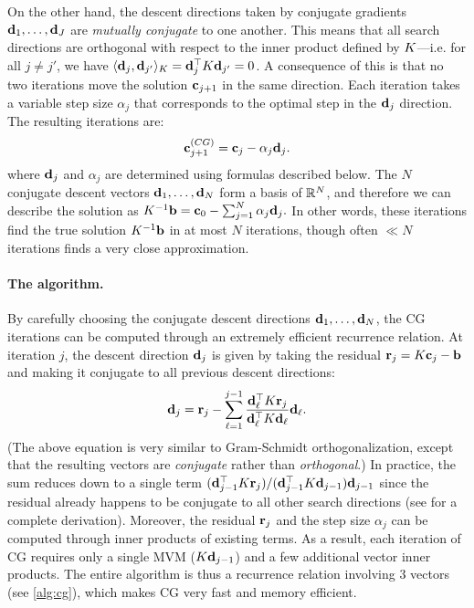 On the other hand, the descent directions taken by conjugate gradients $\mathbf{d}_1, \ldots, \mathbf{d}_J$ are \emph{mutually conjugate} to one another.
This means that all search directions are orthogonal with respect to the inner product defined by $K$---i.e. for all $j \ne j'$, we have $\langle \mathbf{d}_j, \mathbf{d}_{j'} \rangle_{K} = \mathbf{d}_j^\top K \mathbf{d}_{j'} = 0$.
A consequence of this is that no two iterations move the solution $\mathbf{c}_{j+1}$ in the same direction.
Each iteration takes a variable step size $\alpha_j$ that corresponds to the optimal step in the $\mathbf{d}_j$ direction.
The resulting iterations are:
%
\begin{equation*}
  \mathbf{c}_{j+1}^{\text(CG)} = \mathbf{c}_{j} - \alpha_j \mathbf{d}_{j}.
\end{equation*}
%
where $\mathbf{d}_j$ and $\alpha_j$ are determined using formulas described below.
The $N$ conjugate descent vectors $\mathbf{d}_1, \ldots, \mathbf{d}_N$ form a basis of $\mathbb{R}^N$, and therefore we can describe the solution as $K^{-1} \mathbf{b} = \mathbf{c}_0 - \sum_{j=1}^N \alpha_j \mathbf{d}_j.$
In other words, these iterations find the true solution $K^{-1} \mathbf{b}$ in at most $N$ iterations, though often $\ll N$ iterations finds a very close approximation.

\paragraph{The algorithm.}
By carefully choosing the conjugate descent directions $\mathbf{d}_1, \ldots, \mathbf{d}_N$, the CG iterations can be computed through an extremely efficient recurrence relation.
At iteration $j$, the descent direction $\mathbf{d}_j$ is given by taking the residual $\mathbf{r}_j = K \mathbf{c}_{j} - \mathbf{b}$ and making it conjugate to all previous descent directions:
%
\begin{equation*}
  \mathbf{d}_j = \mathbf{r}_j - \sum_{\ell = 1}^{j-1} \frac{ \mathbf{d}_\ell^\top K \mathbf{r}_j }{ \mathbf{d}_\ell^\top K \mathbf{d}_\ell } \mathbf{d}_\ell.
\end{equation*}
%
(The above equation is very similar to Gram-Schmidt orthogonalization, except that the resulting vectors are \emph{conjugate} rather than \emph{orthogonal}.)
In practice, the sum reduces down to a single term $( \mathbf{d}_{j-1}^\top K \mathbf{r}_j ) / ( \mathbf{d}_{j-1}^\top K \mathbf{d}_{j-1} ) \mathbf{d}_{j-1}$ since the residual already happens to be conjugate to all other search directions (see \citep[Sec. 7-8]{shewchuk1994introduction} for a complete derivation).
Moreover, the residual $\mathbf{r}_j$ and the step size $\alpha_j$ can be computed through inner products of existing terms.
As a result, each iteration of CG requires only a single MVM ($K \mathbf{d}_{j-1}$) and a few additional vector inner products.
The entire algorithm is thus a recurrence relation involving 3 vectors (see \cref{alg:cg}), which makes CG very fast and memory efficient.

